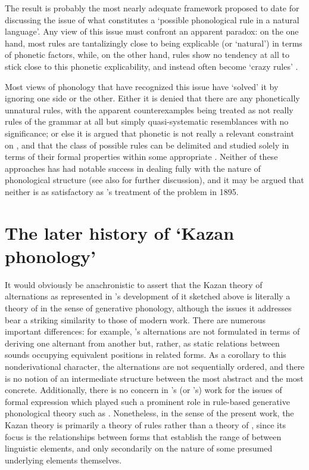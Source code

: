 The result is probably the most nearly adequate framework proposed to
date for discussing the issue of what constitutes a `possible
phonological rule in a natural language'. Any view of this issue must
confront an apparent paradox: on the one hand, most rules are
tantalizingly close to being explicable (or `natural') in terms of
phonetic factors, while, on the other hand, rules show no tendency at
all to stick close to this phonetic explicability, and instead often
become `crazy rules' \citep{bach:harms72:crazy_rules}.

Most views of phonology that have recognized this issue have `solved'
it by ignoring one side or the other. Either it is denied that there
are any phonetically unnatural rules, with the apparent
counterexamples being treated as not really rules of the grammar at
all but simply quasi-systematic resemblances with no significance; or
else it is argued that phonetic  is not really a relevant
constraint on , and that the class of possible rules
can be delimited and studied solely in terms of their formal
properties within some appropriate . Neither of these
approaches has had notable success in dealing fully with the nature of
phonological structure (see also \citealt{sra81:unnatural} for further
discussion), and it may be argued that neither is as satisfactory as
{\Baudouin}'s treatment of the problem in 1895.

\section{The later history of `Kazan phonology'}

It would obviously be anachronistic to assert that the Kazan theory of
alternations as represented in {\Baudouin}'s development of it sketched
above is literally a theory of  in the sense of
generative phonology, although the issues it addresses bear a striking
similarity to those of modern work. There are numerous important
differences: for example, {\Baudouin}'s alternations are not formulated
in terms of deriving one alternant from another but, rather, as static
relations between sounds occupying equivalent positions in related
forms. As a corollary to this nonderivational character, the
alternations are not sequentially ordered, and there is no notion of
an intermediate structure between the most abstract and the most
concrete. Additionally, there is no concern in {\Baudouin}'s (or
{\Kruszewski}'s) work for the issues of formal expression which played
such a prominent role in rule-based generative phonological theory
such as \citet{spe}. Nonetheless, in the sense of the present work,
the Kazan theory is primarily a theory of rules rather than a theory
of , since its focus is the relationships between forms
that establish the range of  between linguistic elements, and
only secondarily on the nature of some presumed underlying 
elements themselves.

